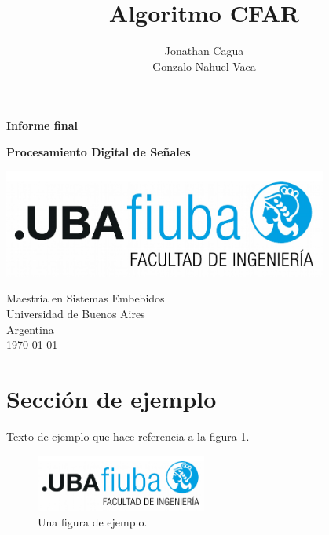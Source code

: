 \documentclass[
    11pt,
    spanish,
	a4paper
]{article}
\title{Algoritmo CFAR}
\author{Jonathan Cagua \\ Gonzalo Nahuel Vaca}
\def\doctype{Informe final}
\begin{document}
\makeatletter
\begin{titlepage}
	\begin{center}
		\vspace*{1cm}

		\Huge
		\textbf{\doctype}
		\vspace{0.5cm}

		\LARGE
		\@title
		\vspace{0.5cm}

		\textbf{Procesamiento Digital de Señales}

		\vspace{1.5cm}

		\textbf{\@author}

		\vspace{1.5cm}

		\includegraphics[width=0.8\textwidth]{Figuras/logoFIUBA.pdf}

		\vfill
		Maestría en Sistemas Embebidos\\
		Universidad de Buenos Aires\\
		Argentina\\
		\today
	\end{center}
\end{titlepage}
\makeatother
\newpage

\section{Sección de ejemplo}

Texto de ejemplo que hace referencia a la figura \ref{fig:ejemplo}.

\begin{figure}[htbp]
	\centering
	\includegraphics[width=0.5\textwidth]{Figuras/logoFIUBA.pdf}
	\caption{Una figura de ejemplo.}
	\label{fig:ejemplo}
\end{figure}
\end{document}
